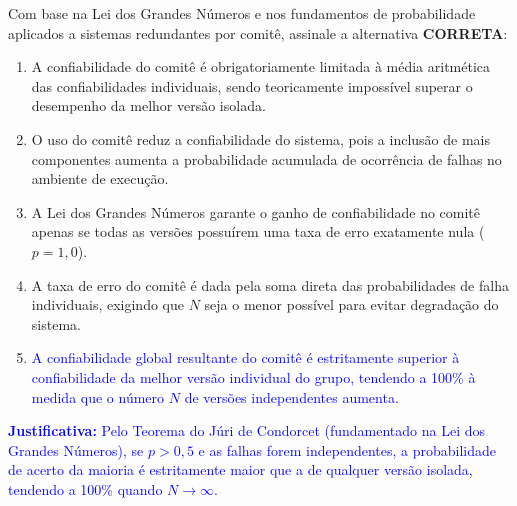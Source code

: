 \documentclass[12pt,a4paper]{article}
\begin{document}
Com base na Lei dos Grandes Números e nos fundamentos de probabilidade aplicados a sistemas redundantes por comitê, assinale a alternativa \textbf{CORRETA}:

\vspace{0.3cm}

\begin{enumerate}[label=\textbf{(\Alph*)}]
    
    \item A confiabilidade do comitê é obrigatoriamente limitada à média aritmética das confiabilidades individuais, sendo teoricamente impossível superar o desempenho da melhor versão isolada.
    \item O uso do comitê reduz a confiabilidade do sistema, pois a inclusão de mais componentes aumenta a probabilidade acumulada de ocorrência de falhas no ambiente de execução.
    \item A Lei dos Grandes Números garante o ganho de confiabilidade no comitê apenas se todas as versões possuírem uma taxa de erro exatamente nula ($p = 1,0$).
    \item A taxa de erro do comitê é dada pela soma direta das probabilidades de falha individuais, exigindo que $N$ seja o menor possível para evitar degradação do sistema.
    \item[\textcolor{blue}{\textbf{(E)}}] \textcolor{blue}{A confiabilidade global resultante do comitê é estritamente superior à confiabilidade da melhor versão individual do grupo, tendendo a 100\% à medida que o número $N$ de versões independentes aumenta.}
\end{enumerate}

\vspace{0.2cm}
\noindent\textcolor{blue}{\small\textbf{Justificativa:} Pelo Teorema do Júri de Condorcet (fundamentado na Lei dos Grandes Números), se $p > 0{,}5$ e as falhas forem independentes, a probabilidade de acerto da maioria é estritamente maior que a de qualquer versão isolada, tendendo a 100\% quando $N \to \infty$.}
\end{document}
